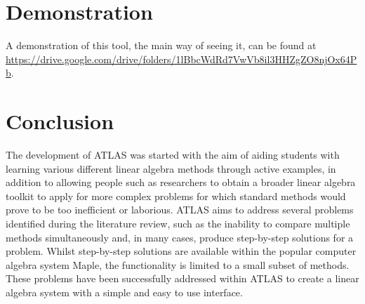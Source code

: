 \documentclass[natbib]{llncs}
\begin{document}
\section{Demonstration}
A demonstration of this tool, the main way of seeing it, can be found at \hfil\break\url{https://drive.google.com/drive/folders/1lBbcWdRd7VwVb8il3HHZgZO8njOx64Pb}.

\section{Conclusion}
The development of ATLAS was started with the aim of aiding students with learning various different linear algebra methods through active examples, in addition to allowing people such as researchers to obtain a broader linear algebra toolkit to apply for more complex problems for which standard methods would prove to be too inefficient or laborious. ATLAS aims to address several problems identified during the literature review, such as the inability to compare multiple methods simultaneously and, in many cases, produce step-by-step solutions for a problem. Whilst step-by-step solutions are available within the popular computer algebra system Maple, the functionality is limited to a small subset of methods. These problems have been successfully addressed within ATLAS to create a linear algebra system with a simple and easy to use interface.

\def\href{\url}\def\path{\url}

\end{document}
